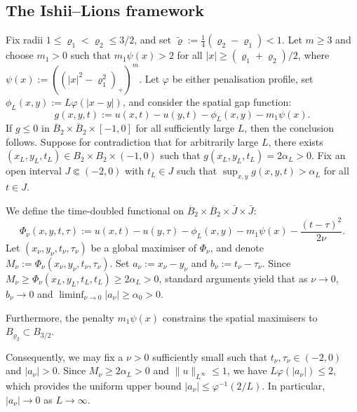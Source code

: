 \documentclass[11pt, a4paper, twoside]{article}
\theoremstyle{definition}
\theoremstyle{remark}
\begin{document}
\subsection{The Ishii--Lions framework}
\label{sec:parabolic-ishii-lions}

Fix radii $1 \le \varrho_1 < \varrho_2 \le 3/2$, and set $\tilde\varrho := \frac{1}{4}(\varrho_2 - \varrho_1) < 1$. Let $m \ge 3$ and choose $m_1 > 0$ such that $m_1\psi(x) > 2$ for all $|x| \ge (\varrho_1+\varrho_2)/2$, where $\psi(x) := ((|x|^2 - \varrho_1^2)_+)^m$. Let $\varphi$ be either penalisation profile, set $\phi_L(x,y) := L\varphi(|x-y|)$, and consider the spatial gap function:
\begin{equation}\label{eq:contradiction-assumption}
     g(x,y,t) := u(x,t) - u(y,t) - \phi_L(x,y) - m_1\psi(x).
\end{equation}
If $g \le 0$ in $\overline{B}_2 \times \overline{B}_2 \times [-1,0]$ for all sufficiently large $L$, then the conclusion follows. Suppose for contradiction that for arbitrarily large $L$, there exists $(x_L,y_L,t_L) \in B_2 \times B_2 \times(-1,0)$ such that $g(x_L,y_L,t_L) = 2\alpha_L > 0$. Fix an open interval $J \Subset (-2,0)$ with $t_L \in J$ such that $\sup_{x,y}g(x,y,t) > \alpha_L$ for all $t \in J$. 

We define the time-doubled functional on $\overline{B}_2 \times \overline{B}_2 \times \bar{J} \times \bar{J}$:
\begin{equation}\label{eq:Phi-nu-def}
  \Phi_\nu(x,y,t,\tau) := u(x,t) - u(y,\tau) - \phi_L(x,y) - m_1\psi(x) - \frac{(t-\tau)^2}{2\nu}.
\end{equation}
Let $(x_\nu,y_\nu,t_\nu,\tau_\nu)$ be a global maximiser of $\Phi_\nu$, and denote $M_\nu := \Phi_\nu(x_\nu,y_\nu,t_\nu,\tau_\nu)$. Set $a_\nu := x_\nu - y_\nu$ and $b_\nu := t_\nu - \tau_\nu$. Since $M_\nu \ge \Phi_\nu(x_L, y_L, t_L, t_L) \ge 2\alpha_L > 0$, standard arguments yield that as $\nu \to 0$, $b_\nu \to 0$ and $\liminf_{\nu \to 0} |a_\nu| \ge \alpha_0 > 0$. 

Furthermore, the penalty $m_1\psi(x)$ constrains the spatial maximisers to $B_{\varrho_2} \subset B_{3/2}$.

Consequently, we may fix a $\nu > 0$ sufficiently small such that $t_\nu, \tau_\nu \in (-2,0)$ and $|a_\nu| > 0$. Since $M_\nu \ge 2\alpha_L > 0$ and $\|u\|_{L^\infty} \le 1$, we have $L\varphi(|a_\nu|) \le 2$, which provides the uniform upper bound $|a_\nu| \le \varphi^{-1}(2/L)$. In particular, $|a_\nu| \to 0$ as $L \to \infty$.
\end{document}
